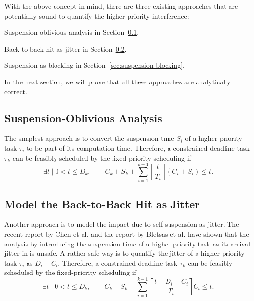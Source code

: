\documentclass[10pt,conference,preprint]{IEEEtran}
\newcommand{\ceiling}[1]{\left\lceil{#1}\right\rceil}
\begin{document}
With the above concept in mind, there are three existing approaches
that are potentially sound to quantify the higher-priority
interference:
\begin{compactitem}
\item Suspension-oblivious analysis in
  Section~\ref{sec:suspension-oblivious}.
\item Back-to-back hit as jitter in Section~\ref{sec:jitter}.
\item Suspension as blocking in Section~\ref{sec:suspension-blocking}.
\end{compactitem}
In the next section, we will prove that all these approaches are
analytically correct. 

\subsection{Suspension-Oblivious Analysis}
\label{sec:suspension-oblivious} 
The simplest approach is to convert the suspension time $S_i$ of a
higher-priority task $\tau_i$ to be part of its computation
time. Therefore, a constrained-deadline task $\tau_k$ can be feasibly
scheduled by the fixed-priority scheduling if
\begin{equation}
\label{eq:TDA-SO}
\exists t \mid 0 < t \leq D_k, \qquad C_k + S_k + \sum_{i=1}^{k-1}\ceiling{\frac{t}{T_i}} (C_i+S_i) \leq t.
\end{equation}

\subsection{Model the Back-to-Back Hit as Jitter}
\label{sec:jitter}

Another approach is to model the impact due to self-suspension as
jitter.  The recent report by Chen et al. and the report by Bletsas et
al. \cite{BletsasReport2015} have shown that the analysis by
introducing the suspension time of a higher-priority task as its
arrival jitter in
\cite{ECRTS-AudsleyB04,RTAS-AudsleyB04,RTCSA-KimCPKH95,MingLiRTCSA1994}
is unsafe.  A rather safe way is to quantify the jitter of a higher-priority
task $\tau_i$ as $D_i-C_i$. Therefore, a constrained-deadline task
$\tau_k$ can be feasibly scheduled by the fixed-priority scheduling if
\begin{equation}
\label{eq:TDA-jitter}
\exists t \mid 0 < t \leq D_k, \qquad C_k + S_k + \sum_{i=1}^{k-1}\ceiling{\frac{t+D_i-C_i}{T_i}} C_i \leq t.
\end{equation}
\end{document}
